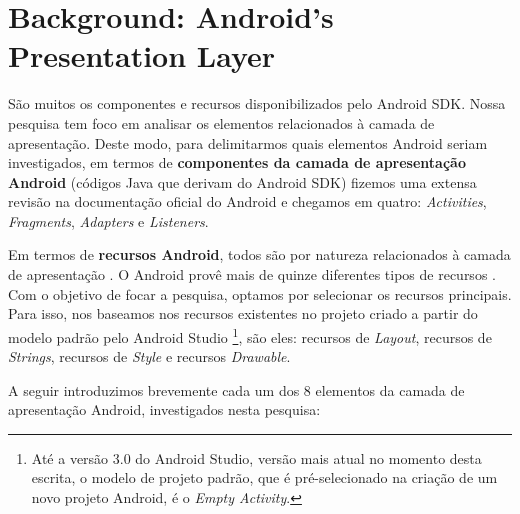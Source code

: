 \section{Background: Android's Presentation Layer}

São muitos os componentes e recursos disponibilizados pelo Android \acs{SDK}. Nossa pesquisa tem foco em analisar os elementos relacionados à camada de apresentação. Deste modo, para delimitarmos quais elementos Android seriam investigados, em termos de \textbf{\small componentes da camada de apresentação Android} (códigos Java que derivam do Android SDK) fizemos uma extensa revisão na documentação oficial do Android \cite{AndroidDeveloperSite2016} e chegamos em quatro: \textit{Activities}, \textit{Fragments}, \textit{Adapters} e \textit{Listeners}.

Em termos de \textbf{\small recursos Android}, todos são por natureza relacionados à camada de apresentação \cite{AndroidFundamentals}. O Android provê mais de quinze diferentes tipos de recursos \cite{AndroidResourceType}. Com o objetivo de focar a pesquisa, optamos por selecionar os recursos principais. Para isso, nos baseamos nos recursos existentes no projeto criado a partir do modelo padrão pelo Android Studio \cite{FirstApp2017}\footnote{Até a versão 3.0 do Android Studio, versão mais atual no momento desta escrita, o modelo de projeto padrão, que é pré-selecionado na criação de um novo projeto Android, é o \textit{Empty Activity}.}, são eles: recursos de \textit{Layout}, recursos de \textit{Strings}, recursos de \textit{Style} e recursos \textit{Drawable}.

A seguir introduzimos brevemente cada um dos 8 elementos da camada de apresentação Android, investigados nesta pesquisa:

